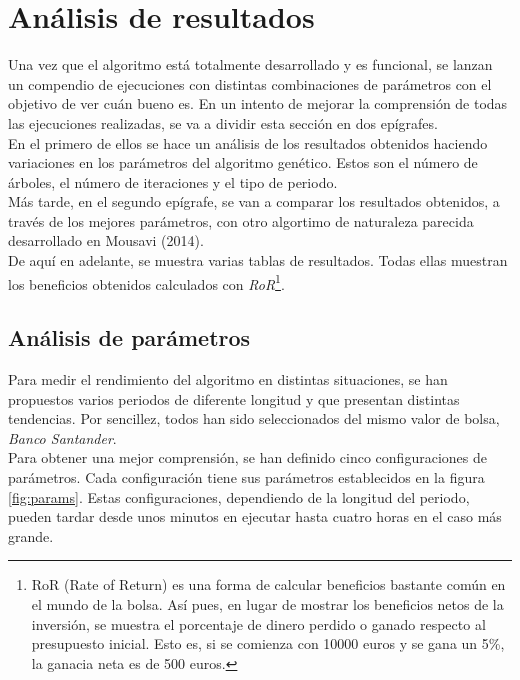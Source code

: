 \section{An\'alisis de resultados}\label{sec:analisis}
Una vez que el algoritmo est\'a totalmente desarrollado y es funcional, se lanzan un compendio de ejecuciones con distintas combinaciones de par\'ametros con el objetivo de ver cu\'an bueno es.
En un intento de mejorar la comprensi\'on de todas las ejecuciones realizadas, se va a dividir esta secci\'on en dos ep\'igrafes. \\

En el primero de ellos se hace un an\'alisis de los resultados obtenidos haciendo variaciones en los par\'ametros del algoritmo gen\'etico. Estos son el n\'umero de \'arboles, el n\'umero de iteraciones y el tipo de periodo.\\

M\'as tarde, en el segundo ep\'igrafe, se van a comparar los resultados obtenidos, a trav\'es de los mejores par\'ametros, con otro algortimo de naturaleza parecida desarrollado en Mousavi (2014).\\

De aqu\'i en adelante, se muestra varias tablas de resultados. Todas ellas muestran los beneficios obtenidos calculados con \textit{RoR}\footnote{RoR (Rate of Return) es una forma de calcular beneficios bastante com\'un en el mundo de la bolsa. As\'i pues, en lugar de mostrar los beneficios netos de la inversi\'on, se muestra el porcentaje de dinero perdido o ganado respecto al presupuesto inicial. Esto es, si se comienza con 10000 euros y se gana un 5\%, la ganacia neta es de 500 euros.}.

\subsection{An\'alisis de par\'ametros}

Para medir el rendimiento del algoritmo en distintas situaciones, se han propuestos varios periodos de diferente longitud y que presentan distintas tendencias. Por sencillez, todos han sido seleccionados del mismo valor de bolsa, \textit{Banco Santander}.\\

Para obtener una mejor comprensi\'on, se han definido cinco configuraciones de par\'ametros. Cada configuraci\'on tiene sus par\'ametros establecidos en la figura \ref{fig:params}. Estas configuraciones, dependiendo de la longitud del periodo, pueden tardar desde unos minutos en ejecutar hasta cuatro horas en el caso m\'as grande.\\

